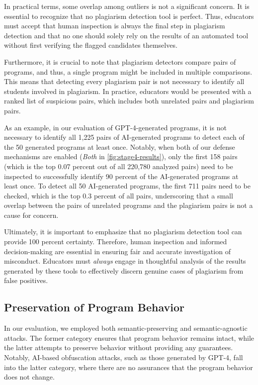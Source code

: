 In practical terms, some overlap among outliers is not a significant concern. It is essential to recognize that no plagiarism detection tool is perfect. Thus, educators must accept that human inspection is always the final step in plagiarism detection and that no one should solely rely on the results of an automated tool without first verifying the flagged candidates themselves. 

Furthermore, it is crucial to note that plagiarism detectors compare pairs of programs, and thus, a single program might be included in multiple comparisons. This means that detecting every plagiarism pair is not necessary to identify all students involved in plagiarism. In practice, educators would be presented with a ranked list of suspicious pairs, which includes both unrelated pairs and plagiarism pairs.

As an example, in our evaluation of GPT-4-generated programs, it is not necessary to identify all 1,225 pairs of AI-generated programs to detect each of the 50 generated programs at least once.
Notably, when both of our defense mechanisms are enabled (\textit{Both} in \autoref{fig:stage4-results}), only the first 158 pairs (which is the top 0.07 percent out of all 220,780 analyzed pairs) need to be inspected to successfully identify 90 percent of the AI-generated programs at least once. To detect all 50 AI-generated programs, the first 711 pairs need to be checked, which is the top 0.3 percent of all pairs, underscoring that a small overlap between the pairs of unrelated programs and the plagiarism pairs is not a cause for concern.

Ultimately, it is important to emphasize that no plagiarism detection tool can provide 100 percent certainty. Therefore, human inspection and informed decision-making are essential in ensuring fair and accurate investigation of misconduct. Educators must \textit{always} engage in thoughtful analysis of the results generated by these tools to effectively discern genuine cases of plagiarism from false positives.

\subsection{Preservation of Program Behavior}

In our evaluation, we employed both semantic-preserving and semantic-agnostic attacks. The former category ensures that program behavior remains intact, while the latter attempts to preserve behavior without providing any guarantees. Notably, AI-based obfuscation attacks, such as those generated by GPT-4, fall into the latter category, where there are no assurances that the program behavior does not change.

